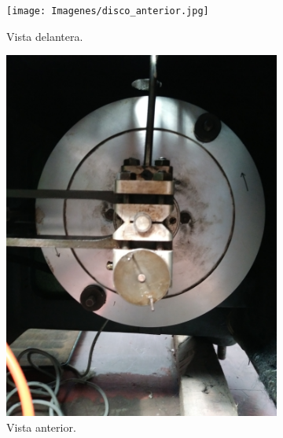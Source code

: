 \begin{figure}[h]
\centering
	\begin{subfigure}{0.32\linewidth}
		\centering
		\texttt{[image: Imagenes/disco\_anterior.jpg]}
		\caption{Vista delantera.}\label{fig:disco_ant}
	\end{subfigure}
	\begin{subfigure}{0.32\linewidth}
		\centering
		\includegraphics[angle=270, origin=c, width=\linewidth]{Imagenes/disco_posterior.jpg}
		\caption{Vista anterior.}\label{fig:disco_post}
	\end{subfigure}
		\begin{subfigure}{0.32\linewidth}
		\centering

\end{subfigure}
\end{figure}
